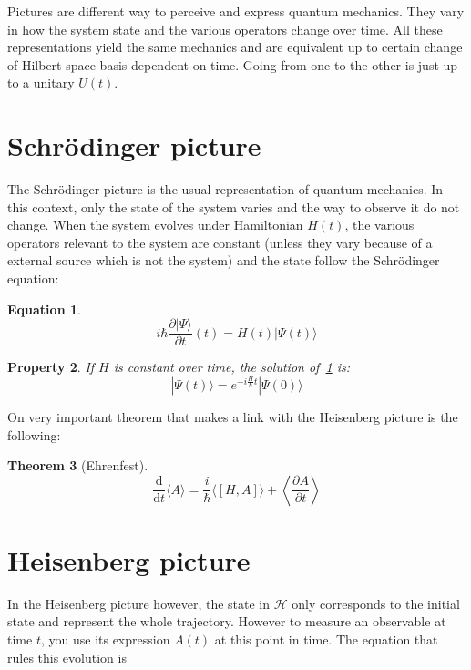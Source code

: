 \documentclass[10pt,a4paper]{report}
\theoremstyle{plain}
\newtheorem{thm}{Theorem}[chapter]
\newtheorem{prop}[thm]{Property}
\theoremstyle{definition}
\newtheorem{eqn}[thm]{Equation}
\theoremstyle{remark}
\newcommand{\ket}[1]{|#1\rangle}
\newcommand{\dd}{\mathrm{d}}
\newcommand{\der}[2]{\frac{\dd{#1}}{\dd{#2}}}
\newcommand{\dpar}[2]{\frac{\partial{#1}}{\partial{#2}}}
\begin{document}
Pictures are different way to perceive and express quantum mechanics. They vary
in how the system state and the various operators change over time. All these
representations yield the same mechanics and are equivalent up to certain change
of Hilbert space basis dependent on time. Going from one to the other is just up
to a unitary $U(t)$.


\section{Schrödinger picture}

The Schrödinger picture is the usual representation of quantum mechanics. In
this context, only the state of the system varies and the way to observe it do
not change. When the system evolves under Hamiltonian $H(t)$,
the various operators relevant to the system are constant (unless they vary
because of a external source which is not the system) and the
state follow the Schrödinger equation:
\begin{eqn}\label{eqn:schro}
\[i\hbar \frac{\partial \ket \Psi}{\partial t} (t) = H(t) \ket {\Psi(t)} \]
\end{eqn}

\begin{prop}
  If $H$ is constant over time, the solution of~\cref{eqn:schro} is:
  \[ \ket {\Psi(t)} = e^{-i\frac H\hbar t}\ket{\Psi(0)}\]
\end{prop}

On very important theorem that makes a link with the Heisenberg picture is the
following:

\begin{thm}[Ehrenfest]\label{thm:ehren}
  \[\der{}t\langle A\rangle = \frac i\hbar\langle[H,A]\rangle + \left\langle\dpar
      A t \right\rangle\]
\end{thm}



\section{Heisenberg picture}

In the Heisenberg picture however, the state in $\mathcal{H}$ only corresponds
to the initial state and represent the whole trajectory. However to measure an
observable at time $t$, you use its expression $A(t)$ at this point in time. The
equation that rules this evolution is
\end{document}
